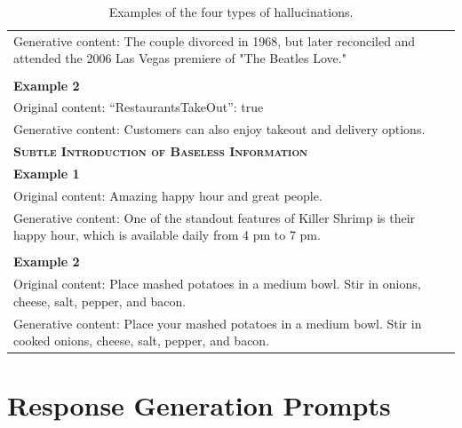 \documentclass[11pt]{article}
\begin{document}
\begin{table}[!ht]
\begin{tabular}{p{}}
    Generative content: The couple divorced in 1968, but later reconciled and attended the 2006 Las Vegas premiere of "The Beatles Love." \\
    \\
    \textbf{Example 2}\\
    Original content: “RestaurantsTakeOut”: true\\
    Generative content: Customers can also enjoy takeout and delivery options.\\
    \midrule
    \textbf{\textsc{Subtle Introduction of Baseless Information}} \\
    \midrule
    \textbf{Example 1}\\
    Original content: Amazing happy hour and great people.\\
    Generative content: One of the standout features of Killer Shrimp is their happy hour, which is available daily from 4 pm to 7 pm.\\
    \\
    \textbf{Example 2}\\
    Original content: Place mashed potatoes in a medium bowl. Stir in onions, cheese, salt, pepper, and bacon.\\
    Generative content: Place your mashed potatoes in a medium bowl. Stir in cooked onions, cheese, salt, pepper, and bacon.\\
    \bottomrule
    \end{tabular}
    \caption{Examples of the four types of hallucinations.} 
    \label{tab:examples}
\end{table}


\clearpage

\section{Response Generation Prompts}
\label{sec:prompts}
\end{document}
